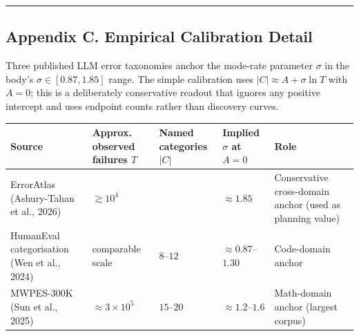 \documentclass[
]{article}
\newcounter{none} %
\begin{document}
\begin{center}\rule{0.5\linewidth}{0.5pt}\end{center}

\subsection{Appendix C. Empirical Calibration
Detail}\label{appendix-c.-empirical-calibration-detail}

Three published LLM error taxonomies anchor the mode-rate parameter
\(\sigma\) in the body's \(\sigma \in [0.87, 1.85]\) range. The simple
calibration uses \(|C| \approx A + \sigma \ln T\) with \(A = 0\); this
is a deliberately conservative readout that ignores any positive
intercept and uses endpoint counts rather than discovery curves.

{\def\LTcaptype{none} %
\begin{longtable}[]{@{}
  >{\raggedright\arraybackslash}p{}
  >{\raggedleft\arraybackslash}p{}
  >{\raggedleft\arraybackslash}p{}
  >{\raggedleft\arraybackslash}p{}
  >{\raggedright\arraybackslash}p{}@{}}
\toprule\noalign{}
\begin{minipage}[b]{\linewidth}\raggedright
Source
\end{minipage} & \begin{minipage}[b]{\linewidth}\raggedleft
Approx. observed failures \(T\)
\end{minipage} & \begin{minipage}[b]{\linewidth}\raggedleft
Named categories \(\lvert C \rvert\)
\end{minipage} & \begin{minipage}[b]{\linewidth}\raggedleft
Implied \(\sigma\) at \(A=0\)
\end{minipage} & \begin{minipage}[b]{\linewidth}\raggedright
Role
\end{minipage} \\
\midrule\noalign{}
\endhead
\bottomrule\noalign{}
\endlastfoot
ErrorAtlas (Ashury-Tahan et al., 2026) & \(\gtrsim 10^4\) & 17 &
\(\approx 1.85\) & Conservative cross-domain anchor (used as planning
value) \\
HumanEval categorisation (Wen et al., 2024) & comparable scale &
\(8\)--\(12\) & \(\approx 0.87\)--\(1.30\) & Code-domain anchor \\
MWPES-300K (Sun et al., 2025) & \(\approx 3 \times 10^5\) &
\(15\)--\(20\) & \(\approx 1.2\)--\(1.6\) & Math-domain anchor (largest
corpus) \\
\end{longtable}
}
\end{document}
